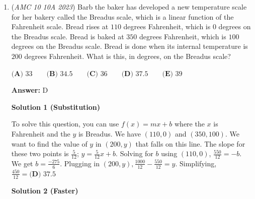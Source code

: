 \begin{enumerate}
 Sequence \#1, (1, 1, 1, x): there are $6$ possible sequences. 

 Sequence \#2, (1, 2, x, y): there are $6^2 = 36$ possible sequences. 

 Sequence \#3, (2, 1, x, y): there are $6^2 = 36$ possible sequences. 

 Sequence \#4, (3, x, y, z): there are $6^3 = 216$ possible sequences.

 Out of 1296 possible sequences, there are a total of $6 + 36 + 36 + 216 = 294$ sequences that qualify. Hence, the probability is $294 / 1296 = \boxed{\textbf{(B) }\frac{49}{216}}$




\textbf{Solution 4 (cheese-ish)}

You have to add 1/216 for the case 1-1-1, so it should have denominator 216. Therefore, the answer is B: 49/216

 -Supernova77

 


 


	\item (\textit{AMC 10 10A 2023}) Barb the baker has developed a new temperature scale for her bakery called the Breadus scale, which is a linear function of the Fahrenheit scale. Bread rises at $110$ degrees Fahrenheit, which is $0$ degrees on the Breadus scale. Bread is baked at $350$ degrees Fahrenheit, which is $100$ degrees on the Breadus scale. Bread is done when its internal temperature is $200$ degrees Fahrenheit. What is this, in degrees, on the Breadus scale?


 $\textbf{(A) }33\qquad\textbf{(B) }34.5\qquad\textbf{(C) }36\qquad\textbf{(D) }37.5\qquad\textbf{(E) }39$

 \textbf{Answer: }D



\textbf{Solution 1 (Substitution)}

To solve this question, you can use $f(x) = mx + b$ where the $x$ is Fahrenheit and the $y$ is Breadus. We have $(110,0)$ and $(350,100)$. We want to find the value of $y$ in $(200,y)$ that falls on this line. The slope for these two points is $\frac{5}{12}$; $y = \frac{5}{12}x + b$. Solving for $b$ using $(110, 0)$, $\frac{550}{12} = -b$. We get $b = \frac{-275}{6}$. Plugging in $(200, y), \frac{1000}{12}-\frac{550}{12}=y$. Simplifying, $\frac{450}{12} = \boxed{\textbf{(D) }37.5}$




\textbf{Solution 2 (Faster)}


\end{enumerate}
